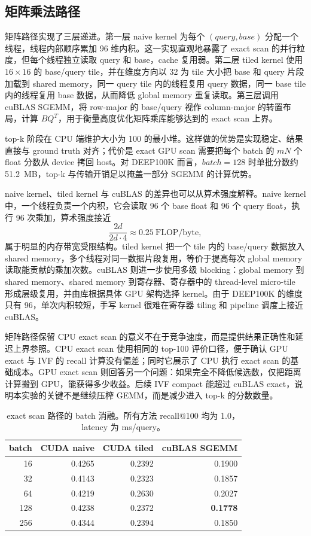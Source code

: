 \documentclass[10pt,a4paper]{article}
\newcommand{\msq}{ms/query}
\begin{document}
\subsection{矩阵乘法路径}

矩阵路径实现了三层递进。第一层 naive kernel 为每个 $(query,base)$ 分配一个线程，线程内部顺序累加 96 维内积。这一实现直观地暴露了 exact scan 的并行粒度，但每个线程独立读取 query 和 base，cache 复用弱。第二层 tiled kernel 使用 $16\times16$ 的 base/query tile，并在维度方向以 32 为 tile 大小把 base 和 query 片段加载到 shared memory，同一 query tile 内的线程复用 query 数据，同一 base tile 内的线程复用 base 数据，从而降低 global memory 重复读取。第三层调用 cuBLAS SGEMM，将 row-major 的 base/query 视作 column-major 的转置布局，计算 $B Q^{T}$，用于衡量高度优化矩阵乘库能够达到的 exact scan 上界。

top-k 阶段在 CPU 端维护大小为 100 的最小堆。这样做的优势是实现稳定、结果直接与 ground truth 对齐；代价是 exact GPU scan 需要把每个 batch 的 $mN$ 个 float 分数从 device 拷回 host。对 DEEP100K 而言，$batch=128$ 时单批分数约 51.2~MB，top-k 与传输开销足以掩盖一部分 SGEMM 的计算优势。

naive kernel、tiled kernel 与 cuBLAS 的差异也可以从算术强度解释。naive kernel 中，一个线程负责一个内积，它会读取 96 个 base float 和 96 个 query float，执行 96 次乘加，算术强度接近
\[
    \frac{2d}{2d\cdot4}\approx 0.25\ \mathrm{FLOP/byte},
\]
属于明显的内存带宽受限结构。tiled kernel 把一个 tile 内的 base/query 数据放入 shared memory，多个线程对同一数据片段复用，等价于提高每次 global memory 读取能贡献的乘加次数。cuBLAS 则进一步使用多级 blocking：global memory 到 shared memory、shared memory 到寄存器、寄存器中的 thread-level micro-tile 形成层级复用，并由库根据具体 GPU 架构选择 kernel。由于 DEEP100K 的维度只有 96，单次内积较短，手写 kernel 很难在寄存器 tiling 和 pipeline 调度上接近 cuBLAS。

矩阵路径保留 CPU exact scan 的意义不在于竞争速度，而是提供结果正确性和延迟上界参照。CPU exact scan 使用相同的 top-100 评价口径，便于确认 GPU exact 与 IVF 的 recall 计算没有偏差；同时它展示了 CPU 执行 exact scan 的基础成本。GPU exact scan 则回答另一个问题：如果完全不降低候选数，仅把距离计算搬到 GPU，能获得多少收益。后续 IVF compact 能超过 cuBLAS exact，说明本实验的关键不是继续压榨 GEMM，而是减少进入 top-k 的分数数量。

\begin{table}[H]
\centering
\small
\caption{exact scan 路径的 batch 消融。所有方法 recall@100 均为 1.0，latency 为 \msq{}。}
\label{tab:exact-batch}
\begin{tabular}{rrrr}
\toprule
batch & CUDA naive & CUDA tiled & cuBLAS SGEMM \\
\midrule
16  & 0.4265 & 0.2392 & 0.1900 \\
32  & 0.4143 & 0.2323 & 0.1857 \\
64  & 0.4219 & 0.2630 & 0.2027 \\
128 & 0.4238 & 0.2372 & \textbf{0.1778} \\
256 & 0.4344 & 0.2394 & 0.1850 \\
\bottomrule
\end{tabular}
\end{table}
\end{document}
